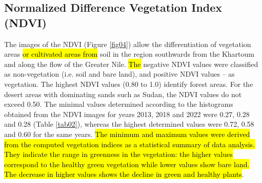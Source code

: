 \documentclass[jimaging,article,submit,pdftex,moreauthors]{Definitions/mdpi}
\begin{document}
\subsection{Normalized Difference Vegetation Index (NDVI)}
The images of the NDVI (Figure \ref{fig04}) allow the differentiation of vegetation areas \hl{or cultivated areas from} soil in the region southwards from the Khartoum and along the flow of the\hl{ }Greater Nile. \hl{The }negative NDVI values were classified as non-vegetation (i.e. soil and bare land), and positive NDVI values -- as vegetation. The highest NDVI values (0.80 to 1.0) identify forest areas. For the desert areas with dominating sands such as Sudan, the NDVI values do not exceed 0.50. The minimal values determined according to the histograms obtained from the NDVI images for years 2013, 2018 and 2022 were 0.27, 0.28 and 0.28 (Table \ref{tab02}), whereas\hl{ }the highest determined values were 0.72, 0.58 and 0.60 for the same years. \hl{The minimum and maximum values were derived from the computed vegetation indices as a statistical summary of data analysis. They indicate the range in greenness in the vegetation: the higher values correspond to the healthy green vegetation while lower values show bare land. The decrease in higher values shows the decline in green and healthy plants}. 
\end{document}
